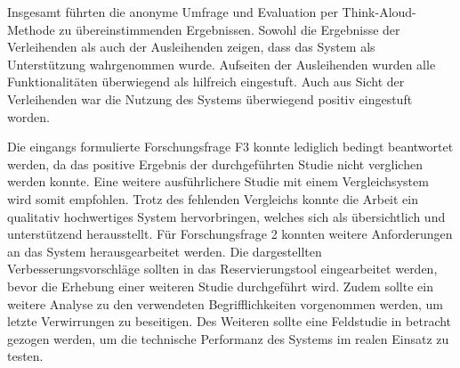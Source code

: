 Insgesamt führten die anonyme Umfrage und Evaluation per Think-Aloud-Methode zu übereinstimmenden
Ergebnissen. Sowohl die Ergebnisse der Verleihenden als auch der Ausleihenden zeigen, dass das
System als Unterstützung wahrgenommen wurde. Aufseiten der Ausleihenden wurden alle Funktionalitäten
überwiegend als hilfreich eingestuft. Auch aus Sicht der Verleihenden war die Nutzung des Systems
überwiegend positiv eingestuft worden.

Die eingangs formulierte Forschungsfrage F3 konnte lediglich bedingt beantwortet werden, da das
positive Ergebnis der durchgeführten Studie nicht verglichen werden konnte. Eine weitere
ausführlichere Studie mit einem Vergleichsystem wird somit empfohlen. Trotz des fehlenden Vergleichs
konnte die Arbeit ein qualitativ hochwertiges System hervorbringen, welches sich als übersichtlich
und unterstützend herausstellt. Für Forschungsfrage 2 konnten weitere Anforderungen an das System
herausgearbeitet werden. Die dargestellten Verbesserungsvorschläge sollten in das Reservierungstool
eingearbeitet werden, bevor die Erhebung einer weiteren Studie durchgeführt wird. Zudem sollte ein
weitere Analyse zu den verwendeten Begrifflichkeiten vorgenommen werden, um letzte Verwirrungen zu
beseitigen. Des Weiteren sollte eine Feldstudie in betracht gezogen werden, um die technische
Performanz des Systems im realen Einsatz zu testen.